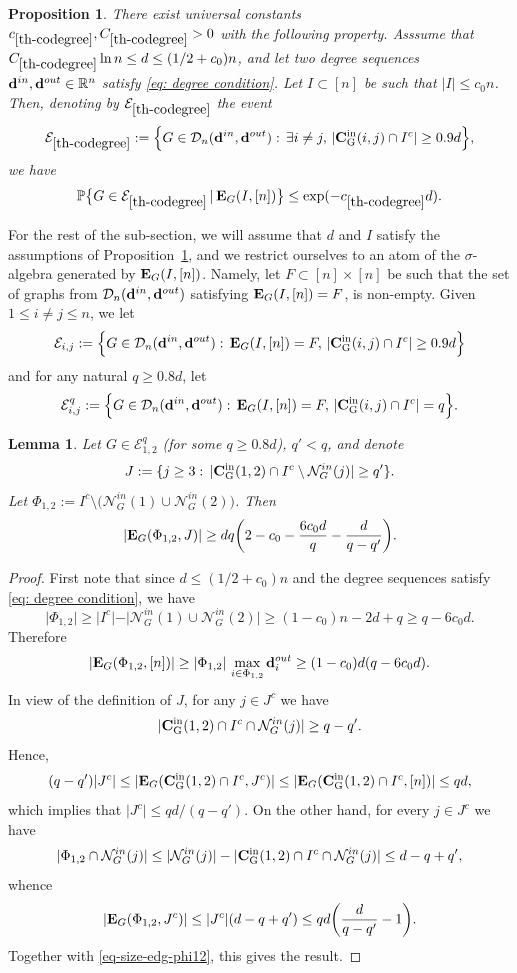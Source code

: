 \documentclass[12pt]{article}
\newtheorem{lemma}[theorem]{Lemma}
\newtheorem{prop}[theorem]{Proposition}
\theoremstyle{definition}
\theoremstyle{plain}
\newcommand{\R}{\mathbb{R}}
\newcommand{\Event}{\mathcal{E}}
\def\nrangr{G}
\def\inco{{\rm {\bf C}_{\nrangr}^{in}}}
\def\innbr{{\mathcal N}_{\nrangr}^{in}}
\def\edg{{\bf E}_{\nrangr}}
\def\Prob{{\mathbb P}}
\def\InDeg{{\bf d}^{in}}
\def\OutDeg{{\bf d}^{out}}
\def\DGraphSet{{\mathcal D}_n}
\begin{document}
\begin{prop}\label{th-codegree}
There exist universal constants $c_{\ref{th-codegree}},C_{\ref{th-codegree}}>0$ with the following property.
Asssume that $C_{\ref{th-codegree}} \ln n\leq d\leq (1/2+c_0)n$,
and let two degree sequences $\InDeg,\OutDeg\in\R^n$ satisfy \eqref{eq: degree condition}.
Let $I\subset [n]$ be such that $\vert I\vert \leq c_0 n$.
Then, denoting by $\Event_{\ref{th-codegree}}$ the event
$$
\Event_{\ref{th-codegree}}:=\Big\{\nrangr\in \DGraphSet(\InDeg,\OutDeg):\, \exists i\neq j,\, \vert\inco(i,j)\cap I^c\vert
\geq 0.9d\Big\},
$$
we have
$$\Prob\big\{\nrangr\in\Event_{\ref{th-codegree}}\,|\,\edg(I,[n])\big\} \leq \exp(-c_{\ref{th-codegree}}d).$$
\end{prop}

\bigskip

For the rest of the sub-section, we will assume that $d$ and $I$ satisfy the assumptions of Proposition~\ref{th-codegree},
and we restrict ourselves to an atom of the $\sigma$-algebra generated by $\edg(I,[n])$.
Namely, let $F\subset[n]\times[n]$ be such that the set of graphs from $\DGraphSet(\InDeg,\OutDeg)$
satisfying $\edg(I,[n])=F$, is non-empty. 
Given $1\leq i\neq j\leq n$, we let 
$$
\Event_{i,j}:=\Big\{\nrangr\in \DGraphSet(\InDeg,\OutDeg):\, \edg(I,[n])=F,\,\vert\inco(i,j)\cap I^c\vert \geq 0.9d\Big\}
$$
and for any natural $q\geq 0.8d$, let
$$
\Event_{i,j}^q:=\Big\{\nrangr\in \DGraphSet(\InDeg,\OutDeg):\, \edg(I,[n])=F,\,\vert\inco(i,j)\cap I^c\vert =q\Big\}.
$$

\begin{lemma}\label{lem-size-gd-edges}
Let $\nrangr\in\Event_{1,2}^q$ (for some $q\geq 0.8d$), $q'<q$,
and denote
$$J:=\{j\geq 3:\, \vert \inco(1,2)\cap I^c\setminus \innbr(j)\vert\geq q'\}.$$
Let $\Phi_{1,2}:= I^c\setminus \big(\innbr(1)\cup\innbr(2)\big)$. Then
$$
\vert \edg(\Phi_{1,2}, J)\vert \geq dq\biggl(2-c_0-\frac{6c_0d}{q}-\frac{d}{q-q'}\biggr). 
$$
\end{lemma}
\begin{proof}
First note that since $d\leq (1/2+c_0)n$ and the degree sequences satisfy \eqref{eq: degree condition},
we have
$$\vert \Phi_{1,2}\vert \geq \vert I^c\vert - \vert \innbr(1)\cup\innbr(2)\vert \geq
(1-c_0)n-2d+q\geq q-6c_0 d.$$
Therefore 
\begin{equation}\label{eq-size-edg-phi12}
\vert \edg(\Phi_{1,2}, [n])\vert \geq \vert \Phi_{1,2}\vert\, \max_{i\in \Phi_{1,2}} \OutDeg_i\geq  (1-c_0)d(q-6c_0 d).
\end{equation}
In view of the definition of $J$, 
for any $j\in J^c$ we have
$$\vert\inco(1,2)\cap I^c\cap \innbr(j)\vert\geq q-q'.$$
Hence,
$$
(q-q')\vert J^c\vert \leq  \vert \edg(\inco(1,2)\cap I^c, J^c)\vert \leq \vert \edg(\inco(1,2)\cap I^c, [n])\vert
\leq qd,
$$ 
which implies that $\vert J^c\vert \leq qd/(q-q')$.
On the other hand, for every $j\in J^c$ we have 
$$
\vert \Phi_{1,2}\cap \innbr(j)\vert\leq \vert\innbr(j)\vert - \vert \inco(1,2)\cap I^c\cap \innbr(j)\vert \leq d-q+q',
$$
whence
$$\vert \edg(\Phi_{1,2}, J^c)\vert\leq \vert J^c\vert (d-q+q')
\leq qd\biggl(\frac{d}{q-q'}-1\biggr).$$
Together with \eqref{eq-size-edg-phi12}, this gives the result.
\end{proof}
\end{document}
